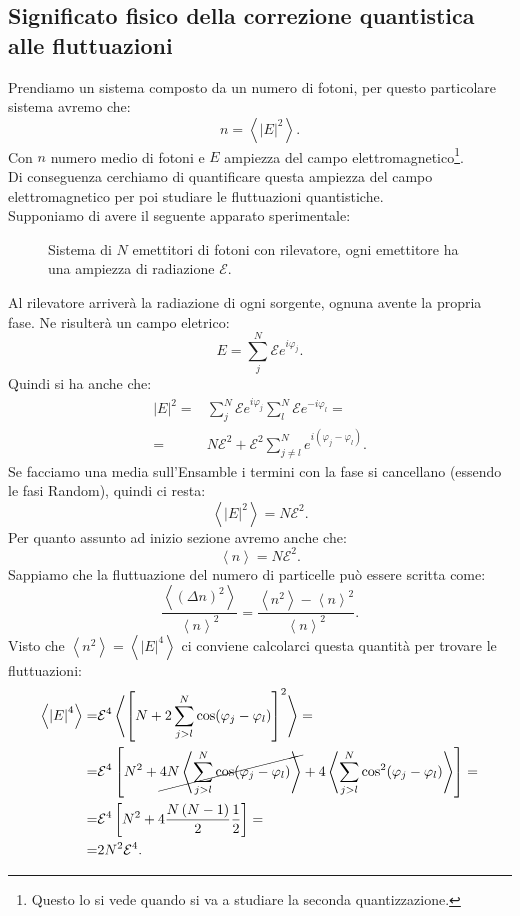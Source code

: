 \subsection{Significato fisico della correzione quantistica alle fluttuazioni}
\label{subsec:Significato fisico della correzione quantistica alle fluttuazioni}
Prendiamo un sistema composto da un numero di fotoni, per questo particolare sistema avremo che:
\[
	n = \left< \left| E \right|^2 \right>
.\] 
Con $n$ numero medio di fotoni e $E$ ampiezza del campo elettromagnetico\footnote{Questo lo si vede quando si va a studiare la seconda quantizzazione.}. \\
Di conseguenza cerchiamo di quantificare questa ampiezza del campo elettromagnetico per poi studiare le fluttuazioni quantistiche.\\
Supponiamo di avere il seguente apparato sperimentale:
\begin{figure}[H]
    \centering
    \caption{Sistema di $N$ emettitori di fotoni con rilevatore, ogni emettitore ha una ampiezza di radiazione $\mathcal{E} $.}
    \label{fig:sistema-di-emettitori-di-fotoni-con-rilevatore}
\end{figure}
\noindent
Al rilevatore arriverà la radiazione di ogni sorgente, ognuna avente la propria fase. Ne risulterà un campo eletrico:
\[
	E = \sum_{j}^{N} \mathcal{E} e^{i \varphi_j}
.\] 
Quindi si ha anche che:
\[\begin{aligned}
	\left| E \right|^2 
	=&
	\sum_{j}^{N} \mathcal{E} e^{i \varphi_j} 
	\sum_{l}^{N} \mathcal{E} e^{-i \varphi_l}=\\
	=&
	N\mathcal{E} ^2 
	+
	\mathcal{E} ^2 \sum_{j \neq l}^{N} e^{i\left( \varphi_j - \varphi_l \right) }
.\end{aligned}\]
Se facciamo una media sull'Ensamble i termini con la fase si cancellano (essendo le fasi Random), quindi ci resta:
\[
	\left<\left| E \right|^2 \right> 
	= 
	N \mathcal{E} ^2
.\] 
Per quanto assunto ad inizio sezione avremo anche che:
\[
	\left<n \right> 
	=
	N \mathcal{E}^2
.\] 
Sappiamo che la fluttuazione del numero di particelle può essere scritta come:
\[
	\frac{\left<\left( \Delta n \right) ^2 \right>}{\left< n \right>^2}
	= 
	\frac{\left<n^2 \right>-\left<n \right>^2}{\left<n \right>^2}
.\] 
Visto che $\left<n^2\right> = \left< \left| E \right| ^4 \right>$ ci conviene calcolarci questa quantità per trovare le fluttuazioni:
\[\begin{aligned}
	\left<\left| E \right| ^4 \right> 
	=&
	\mathcal{E}^4 
	\left<
	\left[ 
	N + 2 \sum_{j >  l}^{N} \cos( \varphi_j-\varphi_l) 
	\right]^2
	\right> =\\
	=&
	\mathcal{E}^4 
	\left[ 
	N^2 
	+
	\cancel{
	4N
	\left<	
	\sum_{j>l}^{N} \cos( \varphi_j - \varphi_l)  
	\right>
	}
	+
	4 
	\left<
	\sum_{j>l}^{N} \cos^2( \varphi_j-\varphi_l) 
	\right>
	\right]=\\
	=&
	\mathcal{E} ^4 
	\left[ 
	N^2 
	+
	4 \frac{N\left( N-1 \right)}{2} \frac{1}{2} 
	\right] =\\
	=&
	2N^2 \mathcal{E}^4
.\end{aligned}\]
